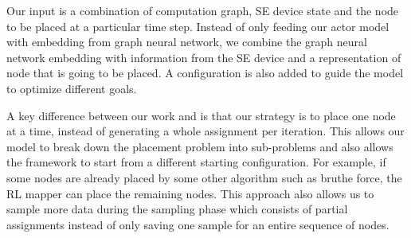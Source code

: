 Our input is a combination of computation graph, SE device state and the node to be placed at a particular time step. 
Instead of only feeding our actor model with embedding from graph neural network, we combine the graph neural network embedding with information from the SE device and a representation of node that is going to be placed. 
A configuration is also added to guide the model to optimize different goals.

A key difference between our work and \cite{zhou2019gdp} is that our strategy is to place one node at a time, instead of generating a whole assignment per iteration. 
This allows our model to break down the placement problem into sub-problems and also allows the framework to start from a different starting configuration. For example, if some nodes are already placed by some other algorithm such as bruthe force, the RL mapper can place the remaining nodes. 
This approach also allows us to sample more data during the sampling phase which consists of partial assignments instead of only saving one sample for an entire sequence of nodes.  